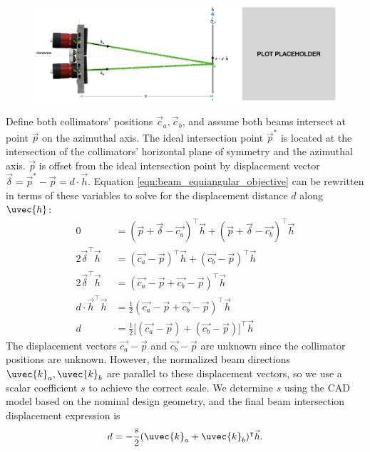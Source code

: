 \begin{figure}
    \centering
    \includegraphics[width=\linewidth]{figures/beam_alignment_geometry.png}
    \caption{}
    \label{fig:beam_alignment_geometry}
\end{figure}
%
Define both collimators' positions $\vec{c}_a, \vec{c}_b$, and assume both beams intersect at point $\vec{p}$ on the azimuthal axis. The ideal intersection point $\vec{p}^*$ is located at the intersection of the collimators' horizontal plane of symmetry and the azimuthal axis. $\vec{p}$ is offset from the ideal intersection point by displacement vector $\vec{\delta} = \vec{p}^* - \vec{p} = d \cdot \vec{h}$. Equation \ref{eqn:beam_equiangular_objective} can be rewritten in terms of these variables to solve for the displacement distance $d$ along $\uvec{h}$:
\begin{equation}
    \begin{split}
    0 &= (\vec{p} + \vec{\delta} - \vec{c_a})^\intercal \vec{h} + (\vec{p} + \vec{\delta} - \vec{c_b})^\intercal \vec{h} \\
    2 \vec{\delta}^\intercal \vec{h} &= (\vec{c_a} - \vec{p})^\intercal \vec{h} + (\vec{c_b} - \vec{p})^\intercal \vec{h} \\
    2 \vec{\delta}^\intercal \vec{h} &= (\vec{c_a} - \vec{p} + \vec{c_b} - \vec{p})^\intercal \vec{h} \\
    d \cdot \vec{h}^\intercal \vec{h} &= \tfrac{1}{2} (\vec{c_a} - \vec{p} + \vec{c_b} - \vec{p})^\intercal \vec{h} \\
    d &= \tfrac{1}{2} \big[(\vec{c_a} - \vec{p}) + (\vec{c_b} - \vec{p})\big]^\intercal \vec{h}
    \end{split}
\end{equation}
%
The displacement vectors $\vec{c_a} - \vec{p}$ and $\vec{c_b} - \vec{p}$ are unknown since the collimator positions are unknown. However, the normalized beam directions $\uvec{k}_a, \uvec{k}_b$ are parallel to these displacement vectors, so we use a scalar coefficient $s$ to achieve the correct scale. We determine $s$ using the CAD model based on the nominal design geometry, and the final beam intersection displacement expression is
%
\begin{equation}
    d = -\frac{s}{2} (\uvec{k}_a + \uvec{k}_b)^\intercal \vec{h}.
    \label{eqn:beam_alignment_displacement}
\end{equation}

